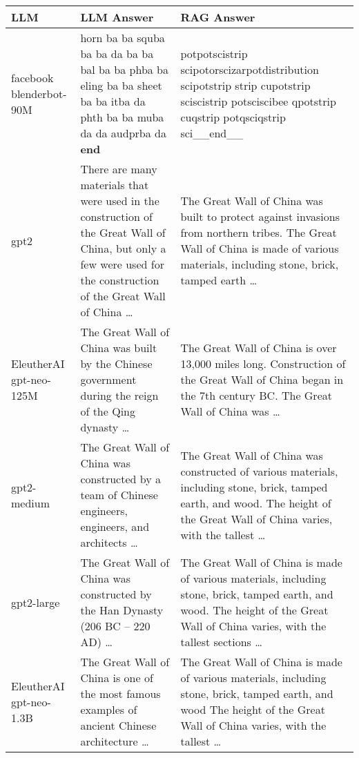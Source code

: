 \documentclass[11pt]{wseas}
\begin{document}
\begin{longtable}[]{@{}
  >{\raggedright\arraybackslash}p{}
  >{\raggedright\arraybackslash}p{}
  >{\raggedright\arraybackslash}p{}@{}}
\toprule\noalign{}
\begin{minipage}[b]{\linewidth}\raggedright
LLM
\end{minipage} & \begin{minipage}[b]{\linewidth}\raggedright
LLM Answer
\end{minipage} & \begin{minipage}[b]{\linewidth}\raggedright
RAG Answer
\end{minipage} \\
\midrule\noalign{}
\endhead
\bottomrule\noalign{}
\endlastfoot
facebook blenderbot-90M & horn ba ba squba ba ba da ba ba bal ba ba phba
ba eling ba ba sheet ba ba itba da phth ba ba muba da da audprba da
\textbf{end} & potpotscistrip scipotorscizarpotdistribution scipotstrip
strip cupotstrip sciscistrip potsciscibee qpotstrip cuqstrip
potqsciqstrip sci\_\_end\_\_ \\
gpt2 & There are many materials that were used in the construction of
the Great Wall of China, but only a few were used for the construction
of the Great Wall of China \ldots{} & The Great Wall of China was built
to protect against invasions from northern tribes. The Great Wall of
China is made of various materials, including stone, brick, tamped earth
\ldots{} \\
EleutherAI gpt-neo-125M & The Great Wall of China was built by the
Chinese government during the reign of the Qing dynasty \ldots{} & The
Great Wall of China is over 13,000 miles long. Construction of the Great
Wall of China began in the 7th century BC. The Great Wall of China was
\ldots{} \\
gpt2-medium & The Great Wall of China was constructed by a team of
Chinese engineers, engineers, and architects \ldots{} & The Great Wall
of China was constructed of various materials, including stone, brick,
tamped earth, and wood. The height of the Great Wall of China varies,
with the tallest \ldots{} \\
gpt2-large & The Great Wall of China was constructed by the Han Dynasty
(206 BC -- 220 AD) \ldots{} & The Great Wall of China is made of various
materials, including stone, brick, tamped earth, and wood. The height of
the Great Wall of China varies, with the tallest sections \ldots{} \\
EleutherAI gpt-neo-1.3B & The Great Wall of China is one of the most
famous examples of ancient Chinese architecture \ldots{} & The Great
Wall of China is made of various materials, including stone, brick,
tamped earth, and wood The height of the Great Wall of China varies,
with the tallest \ldots{} \\
\end{longtable}
\end{document}
